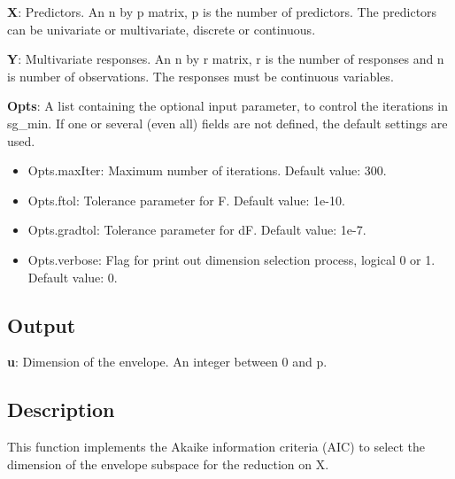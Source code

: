 \documentclass[a4paper,11pt,openany]{memoir}
\begin{document}
\begin{par}
\textbf{X}: Predictors. An n by p matrix, p is the number of predictors. The predictors can be univariate or multivariate, discrete or continuous.
\end{par} \vspace{1em}
\begin{par}
\textbf{Y}: Multivariate responses. An n by r matrix, r is the number of responses and n is number of observations. The responses must be continuous variables.
\end{par} \vspace{1em}
\begin{par}
\textbf{Opts}: A list containing the optional input parameter, to control the iterations in sg\_min. If one or several (even all) fields are not defined, the default settings are used.
\end{par} \vspace{1em}
\begin{itemize}
\setlength{\itemsep}{-1ex}
   \item Opts.maxIter: Maximum number of iterations.  Default value: 300.
   \item Opts.ftol: Tolerance parameter for F.  Default value: 1e-10.
   \item Opts.gradtol: Tolerance parameter for dF.  Default value: 1e-7.
   \item Opts.verbose: Flag for print out dimension selection process, logical 0 or 1. Default value: 0.
\end{itemize}


\subsection*{Output}

\begin{par}
\textbf{u}: Dimension of the envelope. An integer between 0 and p.
\end{par} \vspace{1em}


\subsection*{Description}

\begin{par}
This function implements the Akaike information criteria (AIC) to select the dimension of the envelope subspace for the reduction on X.
\end{par} \vspace{1em}
\end{document}
